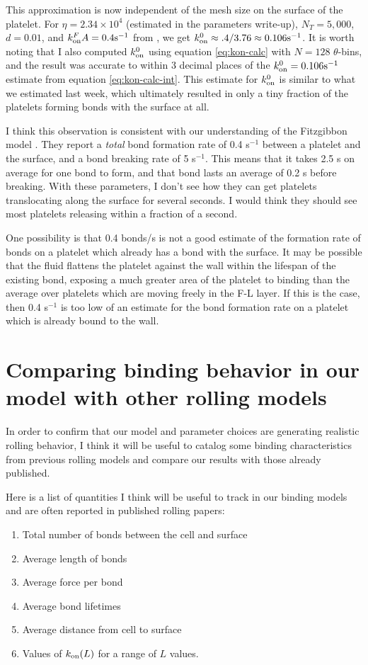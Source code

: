 \documentclass{article}
\newcommand{\tn}{\textnormal}
\begin{document}
This approximation is now independent of the mesh size on the surface
of the platelet. For $\eta = 2.34 \times 10^4$ (estimated in the
parameters write-up), $N_T = 5,000$, $d = 0.01$, and $k_\tn{on}^F A =
0.4 \tn{s}^{-1}$ from \cite{Fitzgibbon2014}, we get $\onConst \approx .4/3.76
\approx 0.106 \tn{s}^{-1}$. It is worth noting that I also computed
$\onConst$ using equation \eqref{eq:kon-calc} with $N=128$
$\theta$-bins, and the result was accurate to within 3 decimal places
of the $\onConst = 0.106 \tn{s}^{-1}$ estimate from equation
\eqref{eq:kon-calc-int}. This estimate for $\onConst$ is similar to
what we estimated last week, which ultimately resulted in only a tiny
fraction of the platelets forming bonds with the surface at all.

I think this observation is consistent with our understanding of the
Fitzgibbon model \cite{Fitzgibbon2014}. They report a \emph{total}
bond formation rate of 0.4 s$^{-1}$ between a platelet and the
surface, and a bond breaking rate of 5 s$^{-1}$. This means that it
takes 2.5 s on average for one bond to form, and that bond lasts an
average of 0.2 s before breaking. With these parameters, I don't see
how they can get platelets translocating along the surface for several
seconds. I would think they should see most platelets releasing within
a fraction of a second.

One possibility is that 0.4 bonds/s is not a good estimate of the
formation rate of bonds on a platelet which already has a bond with
the surface. It may be possible that the fluid flattens the platelet
against the wall within the lifespan of the existing bond, exposing a
much greater area of the platelet to binding than the average over
platelets which are moving freely in the F-L layer. If this is the
case, then 0.4 s$^{-1}$ is too low of an estimate for the bond
formation rate on a platelet which is already bound to the wall.

\section{Comparing binding behavior in our model with other rolling models}
\label{sec:comparing-binding}

In order to confirm that our model and parameter choices are
generating realistic rolling behavior, I think it will be useful to
catalog some binding characteristics from previous rolling models and
compare our results with those already published.

Here is a list of quantities I think will be useful to track in our
binding models and are often reported in published rolling papers:
\begin{enumerate}
\item Total number of bonds between the cell and surface
\item Average length of bonds
\item Average force per bond
\item Average bond lifetimes
\item Average distance from cell to surface
\item Values of $k_\tn{on}(L)$ for a range of $L$ values.
\end{enumerate}
\end{document}
